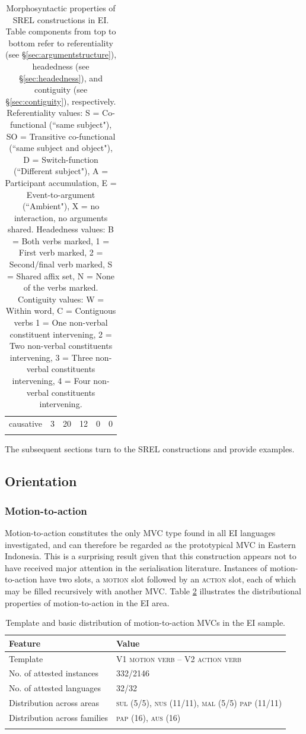 \begin{table}
\begin{tabular}{rrrrrr}
  causative &   3 &  20 &  12 &   0 &   0 \\ 
   \lspbottomrule
\end{tabular}
\caption[Morphosyntactic properties of SREL constructions]{Morphosyntactic properties of SREL constructions in EI. Table components from top to bottom refer to referentiality (see §\ref{sec:argumentstructure}), headedness (see §\ref{sec:headedness}), and contiguity (see §\ref{sec:contiguity}), respectively. Referentiality values: S = Co-functional (``same subject"), SO = Transitive co-functional (``same subject and object"), D = Switch-function (``Different subject"), A = Participant accumulation, E = Event-to-argument (``Ambient"), X = no interaction, no arguments shared. Headedness values: B = Both verbs marked, 1 = First verb marked, 2 = Second/final verb marked, S = Shared affix set, N = None of the verbs marked. Contiguity values: W = Within word, C = Contiguous verbs 1 = One non-verbal constituent intervening, 2 = Two non-verbal constituents intervening, 3 = Three non-verbal constituents intervening, 4 = Four non-verbal constituents intervening.}
\label{table:SREL_formal}
\end{table}

The subsequent sections turn to the SREL constructions and provide examples.

\subsection{Orientation} \label{sec:orientation}
\subsubsection{Motion-to-action} \label{sec:motion-to-action}

Motion-to-action constitutes the only MVC type found in all EI languages investigated, and can therefore be regarded as the prototypical MVC in Eastern Indonesia. This is a surprising result given that this construction appears not to have received major attention in the serialisation literature. Instances of motion-to-action have two slots, a \textsc{motion} slot followed by an \textsc{action} slot, each of which may be filled recursively with another MVC. Table \ref{table:motion-to-action} illustrates the distributional properties of motion-to-action in the EI area.

\begin{table}
\begin{tabular}{ll}
\lsptoprule
Feature&Value\tabularnewline
\midrule
Template&V1 \textsc{motion verb} -- V2 \textsc{action verb}\tabularnewline
No. of attested instances& 332/2146 \tabularnewline
No. of attested languages& 32/32 \tabularnewline
Distribution across areas& \textsc{sul} (5/5), \textsc{nus} (11/11), \textsc{mal} (5/5) \textsc{pap} (11/11) \tabularnewline
Distribution across families& \textsc{pap} (16), \textsc{aus} (16) \tabularnewline
\lspbottomrule
\end{tabular}
\caption[Template and basic distribution of motion-to-action MVCs]{Template and basic distribution of motion-to-action MVCs in the EI sample.}
\label{table:motion-to-action}
\end{table}

